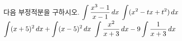 다음 부정적분을 구하시오.
 $\displaystyle\int \dfrac{x^3-1}{x-1}\mkern3mu dx$
 $\displaystyle\int (x^2-tx+t^2)\mkern3mu dx$
 $\displaystyle\int (x+5)^2\mkern3mu dx+\int (x-5)^2\mkern3mu dx$
 $\displaystyle\int \dfrac{x^2}{x+3}\mkern3mu dx-9\int \dfrac{1}{x+3}\mkern3mu dx$
